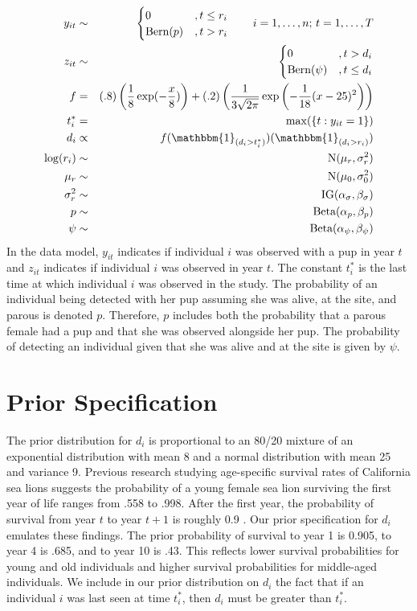 \documentclass[12pt, a4paper]{article}
\begin{document}
\begin{eqnarray*}
y_{it} & \sim & \begin{cases} 0 & , t \leq r_i \\
\text{Bern}(p) & , t > r_i \end{cases} \qquad i = 1,\ldots,n\text{; } t = 1,\ldots,T \\
z_{it} & \sim & \begin{cases} 0 & , t > d_i \\
\text{Bern}(\psi) & , t \leq d_i \end{cases} \\
f &=& (.8)\left(\frac{1}{8} \exp(-\frac{x}{8})\right) + (.2)\left(\frac{1}{3\sqrt{2\pi}} \exp \left(-\frac{1}{18} (x - 25)^2 \right)\right) \\
t_i^* & = & \max(\{t : y_{it} = 1\}) \\
d_i & \propto & f (\mathbbm{1}_{(d_i > t_i^*)}) (\mathbbm{1}_{(d_i > r_i)})  \\
\log(r_i) & \sim & \text{N}(\mu_r, \sigma_r^2) \\
\mu_r & \sim & \text{N}(\mu_0, \sigma_0^2) \\
\sigma_r^2 & \sim & \text{IG}(\alpha_{\sigma}, \beta_{\sigma}) \\
p & \sim & \text{Beta}(\alpha_p, \beta_p) \\
\psi & \sim & \text{Beta}(\alpha_{\psi}, \beta_{\psi} )\\
\end{eqnarray*}
In the data model, $y_{it}$ indicates if individual $i$ was observed with a pup in year $t$ and $z_{it}$ indicates if individual $i$ was observed in year $t$. The constant $t_i^*$ is the last time at which individual $i$ was observed in the study.
The probability of an individual being detected with her pup assuming she was alive, at the site, and parous is denoted $p$. Therefore, $p$ includes both the probability that a parous female had a pup and that she was observed alongside her pup. The probability of detecting an individual given that she was alive and at the site is given by $\psi$.

\section{Prior Specification}

The prior distribution for $d_i$ is proportional to an 80/20 mixture of an exponential distribution with mean 8 and a normal distribution with mean 25 and variance 9. Previous research studying age-specific survival rates of California sea lions suggests the probability of a young female sea lion surviving the first year of life ranges from .558 to .998. After the first year, the probability of survival from year $t$ to year $t+1$ is roughly 0.9 \citep{Hernandez}. Our prior specification for $d_i$ emulates these findings. The prior probability of survival to year 1 is 0.905, to year 4 is .685, and to year 10 is .43. This reflects lower survival probabilities for young and old individuals and higher survival probabilities for middle-aged individuals. We include in our prior distribution on $d_i$ the fact that if an individual $i$ was last seen at time $t_i^*$, then $d_i$ must be greater than $t_i^*$. 
\end{document}
